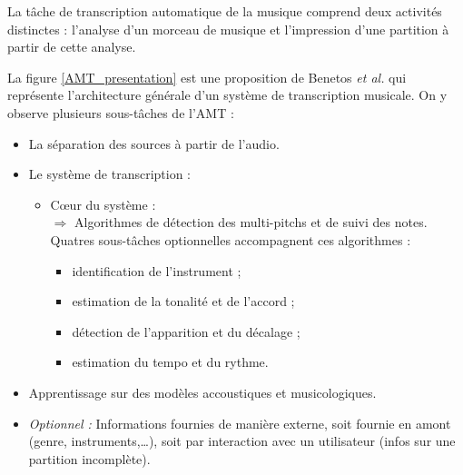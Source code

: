 La tâche de transcription automatique de la musique comprend deux activités distinctes : l'analyse d'un morceau de musique et l'impression d'une partition à partir de cette analyse.


La figure \ref{AMT_presentation} est une proposition de Benetos \textit{et al.} \cite{future_directions} 
qui représente l'architecture générale d'un système de transcription musicale. On y observe plusieurs sous-tâches de l’AMT :
\begin{itemize}
	\item La séparation des sources à partir de l’audio.
	\item Le système de transcription :
	\begin{itemize}
		\item Cœur du système :\\
		$\Rightarrow$ Algorithmes de détection des multi-pitchs et de suivi des \tab notes.\\
		Quatres sous-tâches optionnelles accompagnent ces algorithmes :
		\begin{itemize}
			\item identification de l'instrument ;
			\item estimation de la tonalité et de l'accord ;
			\item détection de l'apparition et du décalage ;
			\item estimation du tempo et du rythme.
		\end{itemize}
	\end{itemize}
	\item Apprentissage sur des modèles accoustiques et musicologiques.
	\item \textit{Optionnel :} Informations fournies de manière externe, soit fournie en amont (genre, instruments,…), soit par interaction avec un utilisateur (infos sur une partition incomplète).
\end{itemize}
